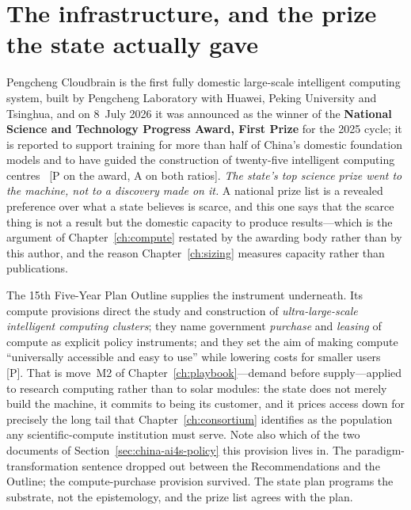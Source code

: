 \section{The infrastructure, and the prize the state actually gave}
\label{sec:china-ai4s-infra}

Pengcheng Cloudbrain is the first fully domestic large-scale intelligent computing system, built by Pengcheng Laboratory with Huawei, Peking University and Tsinghua, and on 8~July 2026 it was announced as the winner of the \textbf{National Science and Technology Progress Award, First Prize} for the 2025 cycle; it is reported to support training for more than half of China's domestic foundation models and to have guided the construction of twenty-five intelligent computing centres~\cite{pengcheng-cloudbrain} [P on the award, A on both ratios]. \emph{The state's top science prize went to the machine, not to a discovery made on it.} A national prize list is a revealed preference over what a state believes is scarce, and this one says that the scarce thing is not a result but the domestic capacity to produce results---which is the argument of Chapter~\ref{ch:compute} restated by the awarding body rather than by this author, and the reason Chapter~\ref{ch:sizing} measures capacity rather than publications.

The 15th Five-Year Plan Outline supplies the instrument underneath. Its compute provisions direct the study and construction of \emph{ultra-large-scale intelligent computing clusters}; they name government \emph{purchase} and \emph{leasing} of compute as explicit policy instruments; and they set the aim of making compute ``universally accessible and easy to use'' while lowering costs for smaller users~\cite{fyp15-ai4s} [P]. That is move~M2 of Chapter~\ref{ch:playbook}---demand before supply---applied to research computing rather than to solar modules: the state does not merely build the machine, it commits to being its customer, and it prices access down for precisely the long tail that Chapter~\ref{ch:consortium} identifies as the population any scientific-compute institution must serve. Note also which of the two documents of Section~\ref{sec:china-ai4s-policy} this provision lives in. The paradigm-transformation sentence dropped out between the Recommendations and the Outline; the compute-purchase provision survived. The state plan programs the substrate, not the epistemology, and the prize list agrees with the plan.


